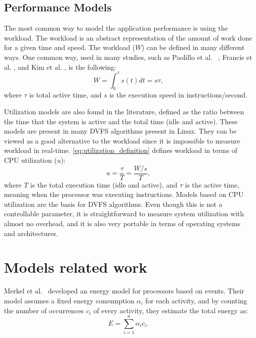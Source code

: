 \subsection{Performance Models} \label{subsec:tb_performance_models}
The most common way to model the application performance is using the workload. The workload is an abstract representation of the amount of work done for a given time and speed. The workload ($W$) can be defined in many different ways. One common way, used in many studies, such as Paolillo et al. ~\cite{Paolillo2018OptimisationParallelism}, Francis et al. \cite{ Group2012HandbookSahni}, and Kim et al. \cite{Kim2015RacingHeuristics}, is the following:
\begin{equation}
W = \int_{0}^{\tau}s(t)dt = s\tau,
\label{eq:workload_definition}
\end{equation}
where $\tau$ is total active time, and $s$ is the execution speed in instructions/second.

Utilization models \cite{Fu2018RaceMinimization, Group2012HandbookSahni} are also found in the literature, defined as the ratio between the time that the system is active and the total time (idle and active). These models are present in many DVFS algorithms present in Linux. They can be viewed as a good alternative to the workload since it is impossible to measure workload in real-time.  \cref{eq:utilization_definition} defines workload in terms of CPU utilization ($u$):
\begin{equation}
u = \frac{\tau}{T} = \frac{W/s}{T},
\label{eq:utilization_definition}
\end{equation}
where $T$ is the total execution time (idle and active), and $\tau$ is the active time, meaning when the processor was executing instructions.
Models based on CPU utilization are the basis for DVFS algorithms. Even though this is not a controllable parameter, it is straightforward to measure system utilization with almost no overhead, and it is also very portable in terms of operating systems and architectures.

\section{Models related work} \label{sec:related_work_models}

Merkel et al.~\cite{Merkel2006BalancingSystems} developed an energy model for processors based on events. Their model assumes a fixed energy consumption $\alpha_i$ for each activity, and by counting the number of occurrences $c_i$ of every activity, they estimate the total energy as:
\begin{equation}
E = \sum_{i=1}^{n}\alpha_ic_i.
\label{equation:rw_merkel}
\end{equation}

